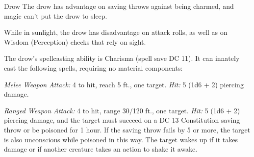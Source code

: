 \documentclass[10pt,a4paper,twoside,bg=print,twocolumn,openany,nodeprecatedcode]{dndbook}
\begin{document}
\begin{DndMonster}[float=t]{Drow}
\DndMonsterBasics[
armor-class = {15 (\textit{chain shirt})},
hit-points = {\DndDice{3d8}},
speed = {30 ft.}
]
\DndMonsterAbilityScores[
 str = 10,
 dex = 14,
 con = 10,
 int = 11,
 wis = 11,
 cha = 12
]
\DndMonsterDetails[
skills = {Perception +2, Stealth +4},
senses = {darkvision 120 ft., passive perception 12},
languages = {Elvish, Undercommon},
challenge = 1/4,
]
The drow has advantage on saving throws against being charmed, and magic can't put the drow to sleep.

While in sunlight, the drow has disadvantage on attack rolls, as well as on Wisdom (Perception) checks that rely on sight.

The drow's spellcasting ability is Charisma (spell save DC 11). It can innately cast the following spells, requiring no material components:
\begin{DndMonsterSpells}
\end{DndMonsterSpells}
\textsl{Melee Weapon Attack:} 4 to hit, reach 5 ft., one target. \textsl{Hit:} 5 (1d6 + 2) piercing damage.

\textsl{Ranged Weapon Attack:} 4 to hit, range 30/120 ft., one target. \textsl{Hit:} 5 (1d6 + 2) piercing damage, and the target must succeed on a DC 13 Constitution saving throw or be poisoned for 1 hour. If the saving throw fails by 5 or more, the target is also unconscious while poisoned in this way. The target wakes up if it takes damage or if another creature takes an action to shake it awake.

\end{DndMonster}
\end{document}
